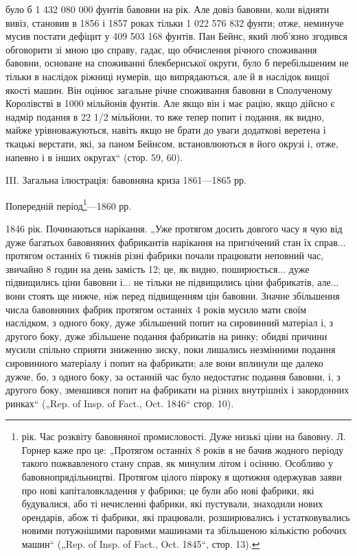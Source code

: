 \parcont{}  %
було б 1 432 080 000 фунтів бавовни на рік. Але довіз бавовни,
коли відняти вивіз, становив в 1856 і 1857 роках тільки
1 022 576 832 фунти; отже, неминуче мусив постати дефіцит
у 409 503 168 фунтів. Пан Бейнс, який люб’язно згодився обговорити
зі мною цю справу, гадає, що обчислення річного споживання
бавовни, основане на споживанні блекбернської округи,
було б перебільшеним не тільки в наслідок ріжниці нумерів, що
випрядаються, але й в наслідок вищої якості машин. Він оцінює загальне
річне споживання бавовни в Сполученому Королівстві в
1000 мільйонів фунтів. Але якщо він і має рацію, якщо дійсно
є надмір подання в 22 1/2 мільйони, то вже тепер попит і подання,
як видно, майже урівноважуються, навіть якщо не брати до
уваги додаткові веретена і ткацькі верстати, які, за паном
Бейнсом, встановлюються в його окрузі і, отже, напевно і
в інших округах“ (стор. 59, 60).

III. Загальна ілюстрація: бавовняна криза 1861—1865 рр.

Попередній період\footnote{
рік. Час розквіту бавовняної промисловості. Дуже низькі
ціни на бавовну. Л. Горнер каже про це: „Протягом останніх
8 років я не бачив жодного періоду такого пожвавленого стану
справ, як минулим літом і осінню. Особливо у бавовнопрядільництві.
Протягом цілого півроку я щотижня одержував заяви
про нові капіталовкладення у фабрики; це були або нові фабрики,
які будувалися, або ті нечисленні фабрики, які пустували, знаходили
нових орендарів, абож ті фабрики, які працювали, розширювались
і устатковувались новими потужнішими паровими машинами
та збільшеною кількістю робочих машин“ („Rep. of Insp.
of Fact., Oct. 1845“, стор. 13).
}—1860 рр.

1846 рік. Починаються нарікання. „Уже протягом досить довгого
часу я чую від дуже багатьох бавовняних фабрикантів нарікання
на пригнічений стан їх справ... протягом останніх 6 тижнів
різні фабрики почали працювати неповний час, звичайно
8 годин на день замість 12; це, як видно, поширюється... дуже
підвищились ціни бавовни і... не тільки не підвищились ціни
фабрикатів, але... вони стоять ще нижче, ніж перед підвищенням
цін бавовни. Значне збільшення числа бавовняних фабрик
протягом останніх 4 років мусило мати своїм наслідком,
з одного боку, дуже збільшений попит на сировинний матеріал
і, з другого боку, дуже збільшене подання фабрикатів на ринку;
обидві причини мусили спільно сприяти зниженню зиску, поки
лишались незмінними подання сировинного матеріалу і попит
на фабрикати; але вони вплинули ще далеко дужче, бо, з одного
боку, за останній час було недостатнє подання бавовни,
і, з другого боку, зменшився попит на фабрикати на різних
внутрішніх і закордонних ринках“ („Rep. of Insp. of Fact., Oct.
1846“ стор. 10).
